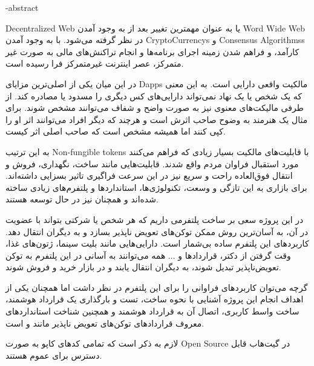 



\fa-abstract{
\gls{Decentralized Web}
یا
 به عنوان مهمترین تغییر بعد از به وجود آمدن
\gls{Word Wide Web}
 در نظر گرفته می‌شود. با به وجود آمدن
\glspl{CryptoCurrency}
و
\glspl{Consensus Algorithms}
کارآمد، و فراهم شدن زمینه اجرای برنامه‌ها و انجام تراکنش‌های مالی به صورت غیر متمرکز،
عصر اینترنت غیرمتمرکز فرا رسیده است.

در این میان یکی از اصلی‌ترین مزایای 
\glspl{Dapp}
مالکیت واقعی دارایی است.
به این معنی که یک شخص یا یک نهاد نمی‌تواند دارایی‌های کس دیگری را مسدود یا مصادره کند.
از طرفی مالیکت‌های معنوی نیز به صورت واضح و شفاف می‌توانند مشخص شوند.
برای مثال یک هنرمند به وضوح صاحب اثرش است و هرچند که دیگر افراد می‌توانند اثر او را کپی کنند
اما همیشه مشخص است که صاحب اصلی اثر کیست.

به این ترتیب 
\glspl{Non-fungible token}
با قابلیت‌های مالکیت بسیار زیادی که فراهم می‌کنند مورد استقبال فراوان مردم واقع شدند.
قابلیت‌هایی مانند ساخت، نگهداری، فروش و انتقال فوق‌العاده راحت و سریع نیز
در این سرعت فراگیری تاثیر بسزایی داشته‌اند.
برای بازاری به این تازگی و وسعت، تکنولوژی‌ها، استاندارد‌ها و پلتفرم‌های زیادی ساخته شده‌اند
و همچنان نیز در حال توسعه هستند.

در این پروژه سعی بر ساخت پلتفرمی داریم که هر شخص یا شرکتی بتواند با عضویت در آن،
به آسان‌ترین روش ممکن توکن‌های تعویض ناپذیر‌ بسازد و به دیگران انتقال دهد.
کاربرد‌های این پلتفرم ساده بی‌شمار است.
دارایی‌هایی مانند بلیت سینما، ژتون‌های غذا، وقت گرفتن از دکتر، قراردادها و ... همه
می‌توانند به آسانی در این پلتفرم به توکن تعویض‌ناپذیر تبدیل شوند،
به دیگران انتقال یابند و در بازار خرید و فروش شوند.

گرچه می‌توان کاربردهای فراوانی را برای این پلتفرم در نظر داشت
اما همچنان یکی از اهداف انجام این پروژه آشنایی با نحوه ساخت، تست و بارگذاری یک قرارداد هوشمند،
ساخت واسط کاربری، اتصال آن به قرارداد هوشمند
و همچنین شناخت استاندارد‌های معروف قرارداد‌های توکن‌های تعویض ناپذیر مانند
و
است.

لازم به ذکر است که تمامی کدهای کاپو به صورت
\gls{Open Source}
در 
گیت‌هاب
قابل دسترس برای عموم هستند.
}
